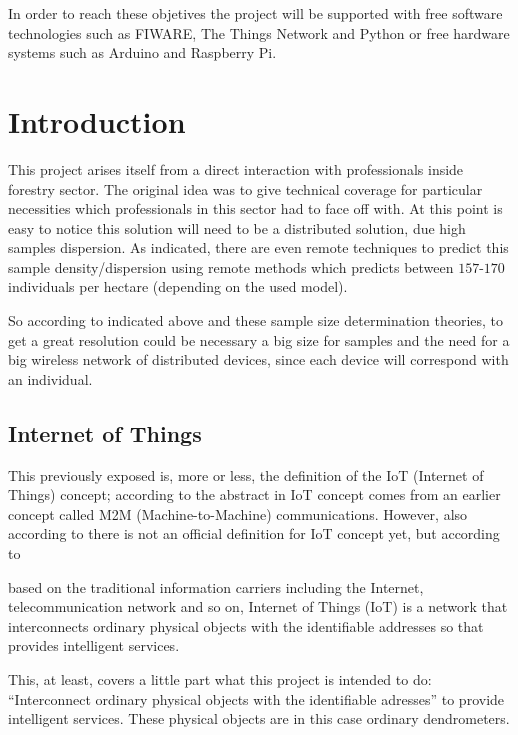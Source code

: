 \documentclass[11pt,a4paper,dvipsnames,twoside]{article}
\begin{document}
In order to reach these objetives the project will be supported with free software technologies such as FIWARE\cite{FIWARE}, The Things Network\cite{TTN} and Python\cite{Python} or free hardware systems such as Arduino\cite{Arduino} and Raspberry Pi\cite{Raspberrypi}.

\newpage
\section{Introduction}\thispagestyle{plain}
This project arises itself from a direct interaction with professionals inside forestry sector. The original idea was to give technical coverage for particular necessities which professionals in this sector had to face off with. At this point is easy to notice this solution will need to be a distributed solution, due high samples dispersion. As indicated, there are even remote techniques to predict this sample density/dispersion using remote methods which predicts between $157$-$170$ individuals per hectare\cite{ForestStandVol} (depending on the used model). 

So according to indicated above and these sample size determination theories, to get a great resolution could be necessary a big size for samples and the need for a big wireless network of distributed devices, since each device will correspond with an individual.

\subsection{Internet of Things}
This previously exposed is, more or less, the definition of the IoT (Internet of Things) concept; according to the abstract in \cite{IoTOverview} IoT concept comes from an earlier concept called M2M (Machine-to-Machine) communications. However, also according to \cite[p.~1(71)]{IoTOverview} there is not an official definition for IoT concept yet, but according to \cite[p.~2(920)]{IoTObjetives}

\begin{quoting}
  based on the traditional information carriers including the Internet, telecommunication  network  and  so  on,  Internet  of Things (IoT) is a network that interconnects ordinary physical  objects  with  the identifiable addresses  so that provides intelligent services.
\end{quoting}

This, at least, covers a little part what this project is intended to do: \enquote{Interconnect ordinary physical objects with the identifiable adresses} to provide intelligent services. These physical objects are in this case ordinary dendrometers.
\end{document}
